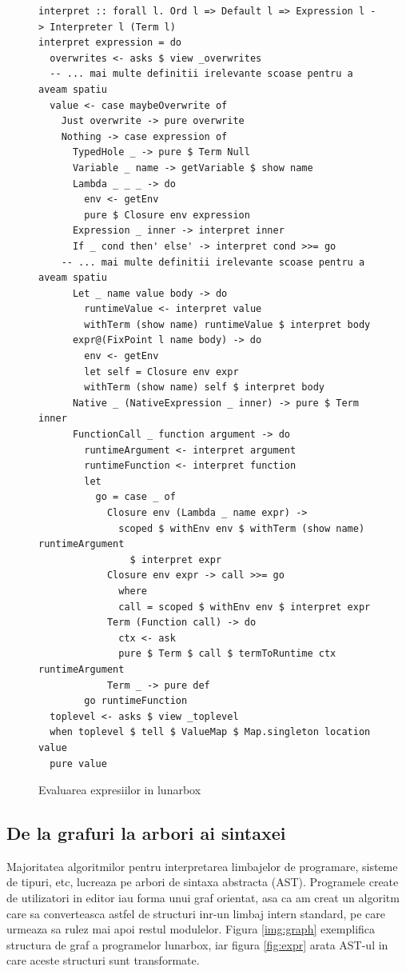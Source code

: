 \documentclass{article}
\begin{document}
\begin{figure}[ht]
	\centering
	\begin{verbatim}
interpret :: forall l. Ord l => Default l => Expression l -> Interpreter l (Term l)
interpret expression = do
  overwrites <- asks $ view _overwrites
  -- ... mai multe definitii irelevante scoase pentru a aveam spatiu
  value <- case maybeOverwrite of
    Just overwrite -> pure overwrite
    Nothing -> case expression of
      TypedHole _ -> pure $ Term Null
      Variable _ name -> getVariable $ show name
      Lambda _ _ _ -> do
        env <- getEnv
        pure $ Closure env expression
      Expression _ inner -> interpret inner
      If _ cond then' else' -> interpret cond >>= go
	-- ... mai multe definitii irelevante scoase pentru a aveam spatiu
      Let _ name value body -> do
        runtimeValue <- interpret value
        withTerm (show name) runtimeValue $ interpret body
      expr@(FixPoint l name body) -> do
        env <- getEnv
        let self = Closure env expr
        withTerm (show name) self $ interpret body
      Native _ (NativeExpression _ inner) -> pure $ Term inner
      FunctionCall _ function argument -> do
        runtimeArgument <- interpret argument
        runtimeFunction <- interpret function
        let
          go = case _ of
            Closure env (Lambda _ name expr) ->
              scoped $ withEnv env $ withTerm (show name) runtimeArgument
                $ interpret expr
            Closure env expr -> call >>= go
              where
              call = scoped $ withEnv env $ interpret expr
            Term (Function call) -> do
              ctx <- ask
              pure $ Term $ call $ termToRuntime ctx runtimeArgument
            Term _ -> pure def
        go runtimeFunction
  toplevel <- asks $ view _toplevel
  when toplevel $ tell $ ValueMap $ Map.singleton location value
  pure value
\end{verbatim}
	\caption{Evaluarea expresiilor in lunarbox}
	\label{fig:eval}
\end{figure}

\subsection{De la grafuri la arbori ai sintaxei}
\par Majoritatea algoritmilor pentru interpretarea limbajelor de programare, sisteme de tipuri, etc, lucreaza pe arbori de sintaxa abstracta (AST).
Programele create de utilizatori in editor iau forma unui graf orientat, asa ca am creat un algoritm care sa converteasca astfel de structuri inr-un limbaj intern standard, pe care urmeaza sa rulez mai apoi restul modulelor.
Figura \ref{img:graph} exemplifica structura de graf a programelor lunarbox, iar figura \ref{fig:expr} arata AST-ul in care aceste structuri sunt transformate.
\end{document}
